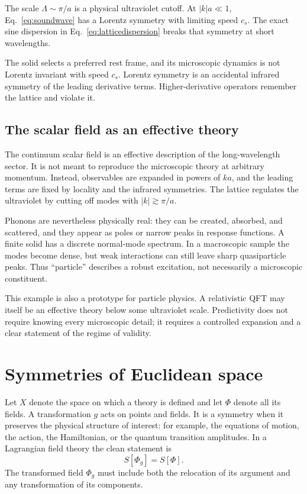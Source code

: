 \documentclass[11pt]{article}
\begin{document}
The scale $\Lambda\sim\pi/a$ is a physical ultraviolet cutoff.  At
$|k|a\ll1$, Eq.~\eqref{eq:soundwave} has a Lorentz symmetry with limiting
speed $c_s$.  The exact sine dispersion in Eq.~\eqref{eq:latticedispersion}
breaks that symmetry at short wavelengths.

\begin{warningbox}
The solid selects a preferred rest frame, and its microscopic dynamics is not
Lorentz invariant with speed $c_s$.  Lorentz symmetry is an accidental
infrared symmetry of the leading derivative terms.  Higher-derivative
operators remember the lattice and violate it.
\end{warningbox}

\subsection{The scalar field as an effective theory}

The continuum scalar field is an effective description of the long-wavelength
sector.  It is not meant to reproduce the microscopic theory at arbitrary
momentum.  Instead, observables are expanded in powers of $ka$, and the
leading terms are fixed by locality and the infrared symmetries.  The lattice
regulates the ultraviolet by cutting off modes with $|k|\gtrsim\pi/a$.

Phonons are nevertheless physically real: they can be created, absorbed, and
scattered, and they appear as poles or narrow peaks in response functions.  A
finite solid has a discrete normal-mode spectrum.  In a macroscopic sample
the modes become dense, but weak interactions can still leave sharp
quasiparticle peaks.  Thus ``particle'' describes a robust excitation, not
necessarily a microscopic constituent.

This example is also a prototype for particle physics.  A relativistic QFT
may itself be an effective theory below some ultraviolet scale.  Predictivity
does not require knowing every microscopic detail; it requires a controlled
expansion and a clear statement of the regime of validity.

\section{Symmetries of Euclidean space}

Let $X$ denote the space on which a theory is defined and let $\Phi$ denote
all its fields.  A transformation $g$ acts on points and fields.  It is a
symmetry when it preserves the physical structure of interest: for example,
the equations of motion, the action, the Hamiltonian, or the quantum
transition amplitudes.  In a Lagrangian field theory the clean statement is
\begin{equation}
  S[\Phi_g]=S[\Phi].
  \label{eq:actionsymmetry}
\end{equation}
The transformed field $\Phi_g$ must include both the relocation of its
argument and any transformation of its components.
\end{document}
